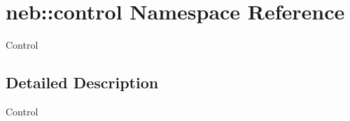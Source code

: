 \hypertarget{namespaceneb_1_1control}{\section{neb\-:\-:control \-Namespace \-Reference}
\label{namespaceneb_1_1control}
}


\-Control  




\subsection{\-Detailed \-Description}
\-Control 